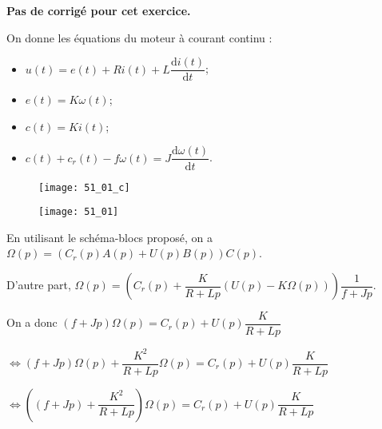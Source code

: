 \normaltrue \difficilefalse \tdifficilefalse
\correctiontrue


\setcounter{numques}{0}
\ifcorrection
\else
\textbf{Pas de corrigé pour cet exercice.}
\fi


\ifprof 
\else
On donne les équations du moteur à courant continu :
\begin{itemize}
\item $u(t) = e(t)+ Ri(t) +L \dfrac{\text{d}i(t)}{\text{d} t}$;
\item $e(t)=K\omega(t)$;
\item $c(t)=Ki(t)$;
\item $c(t)+c_r(t)- f\omega(t)=J\dfrac{\text{d}\omega(t)}{\text{d} t}$.
\end{itemize}
\fi

\ifprof
\begin{figure}[H]
\centering
\texttt{[image: 51\_01\_c]}
\end{figure}
\else
\fi



\ifprof
\begin{figure}[H]
\centering
\texttt{[image: 51\_01]}
\end{figure}


En utilisant le schéma-blocs proposé, on a $\Omega(p) = \left(C_r(p)A(p)+U(p)B(p)\right)C(p)$.

D'autre part,  $\Omega(p)=\left( C_r(p) + \dfrac{K}{R+Lp}\left(U(p)-K\Omega(p) \right) \right) \dfrac{1}{f+Jp}$.

On a donc $\left(f+Jp \right)\Omega(p)= C_r(p) + U(p)\dfrac{K}{R+Lp}  $

$\Leftrightarrow \left(f+Jp \right)\Omega(p)+ \dfrac{K^2}{R+Lp}\Omega(p)  = C_r(p) + U(p)\dfrac{K}{R+Lp} $

$\Leftrightarrow \left(\left(f+Jp \right)+ \dfrac{K^2}{R+Lp}\right)\Omega(p)  = C_r(p) + U(p)\dfrac{K}{R+Lp} $

